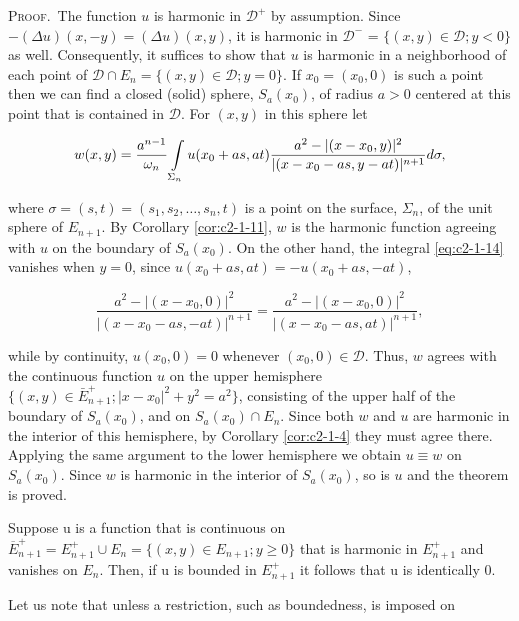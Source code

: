 \textsc{Proof.}\ The function $u$ is harmonic in $\mathcal{D}^+$ by assumption. Since $-(\Delta u)(x, -y) = (\Delta u)(x, y)$, it is harmonic in $\mathcal{D}^-$ = $\{(x, y) \in \mathcal{D}; y < 0\}$ as well. Consequently, it suffices to show that $u$ is harmonic in a neighborhood of each point of $\mathcal{D} \cap E_n = \{(x, y) \in \mathcal{D}; y = 0\}$. If $x_0 = (x_0, 0)$ is such a point then we can find a closed (solid) sphere, $S_a(x_0)$, of radius $a > 0$ centered at this point that is contained in $\mathcal{D}$. For $(x, y)$ in this sphere let

\begin{equation}\label{eq:c2-1-14}
w(x,y)=\frac{a^{n-1}}{\omega_{n}}\intop_{\Sigma_{n}}u(x_{0}+a s,a t)\frac{a^{2}-|(x-x_{0},y)|^{2}}{|(x-x_{0}-a s,y-a t)|^{n+1}}d\sigma,
\end{equation}

where $\sigma = (s, t) = (s_1, s_2, \ldots, s_n, t)$ is a point on the surface, $\Sigma_n$, of the unit sphere of $E_{n+1}$. By Corollary \ref{cor:c2-1-11}, $w$ is the harmonic function agreeing with $u$ on the boundary of $S_a(x_0)$. On the other hand, the integral \eqref{eq:c2-1-14} vanishes when $y = 0$, since $u(x_0 + as, at) = -u(x_0 + as, -at)$,

\[
\frac{a^{2}-|(x-x_{0},0)|^{2}}{|(x-x_{0}-as,-at)|^{n+1}}=\frac{a^{2}-|(x-x_{0},0)|^{2}}{|(x-x_{0}-as,at)|^{n+1}},
\]

while by continuity, $u(x_0,0)=0$ whenever $(x_0,0)\in\mathcal{D}$. Thus, $w$ agrees with the continuous function $u$ on the upper hemisphere $\{(x,y)\in\bar{E}_{n+1}^+ ; |x-x_0|^2+y^2=a^2\}$, consisting of the upper half of the boundary of $S_a(x_0)$, and on $S_a(x_0)\cap E_n$. Since both $w$ and $u$ are harmonic in the interior of this hemisphere, by Corollary \ref{cor:c2-1-4} they must agree there. Applying the same argument to the lower hemisphere we obtain $u\equiv w$ on $S_a(x_0)$. Since $w$ is harmonic in the interior of $S_a(x_0)$, so is $u$ and the theorem is proved.

\begin{corollary}
\label{cor:c2-1-15}
Suppose u is a function that is continuous on $\overline{E}_{n+1}^{+} = E_{n+1}^{+} \cup E_n = \{(x, y) \in E_{n+1}; y \geq 0\}$ that is harmonic in $E_{n+1}^{+}$ and vanishes on $E_n$. Then, if u is bounded in $E_{n+1}^{+}$ it follows that u is identically 0.
\end{corollary}

Let us note that unless a restriction, such as boundedness, is imposed on

